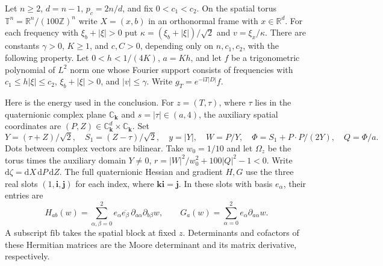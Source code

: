 Let $n\ge2$, $d=n-1$, $p_c=2n/d$, and fix $0<c_1<c_2$. On the spatial torus $\mathbb T^n=\mathbb R^n/(100\mathbb Z)^n$ write $X=(x,b)$ in an orthonormal frame with $x\in\mathbb R^d$. For each frequency with $\xi_b+|\xi|>0$ put $\kappa=(\xi_b+|\xi|)/\sqrt2$ and $v=\xi_x/\kappa$. There are constants $\gamma>0$, $K\ge1$, and $c,C>0$, depending only on $n,c_1,c_2$, with the following property. Let $0<h<1/(4K)$, $a=Kh$, and let $f$ be a trigonometric polynomial of $L^2$ norm one whose Fourier support consists of frequencies with $c_1\le h|\xi|\le c_2$, $\xi_b+|\xi|>0$, and $|v|\le\gamma$. Write $g_T=e^{-\mathrm i T|D|}f$.

Here is the energy used in the conclusion. For $z=(T,\tau)$, where $\tau$ lies in the quaternionic complex plane $\mathbb C_{\mathbf k}$ and $s=|\tau|\in(a,4)$, the auxiliary spatial coordinates are $(P,Z)\in\mathbb C_{\mathbf k}^{d}\times\mathbb C_{\mathbf k}$. Set
\[
Y=(\tau+Z)/\sqrt2,\quad S_1=(Z-\tau)/\sqrt2,\quad
y=|Y|,\quad W=P/Y,\quad \Phi=S_1+P\cdot P/(2Y),\quad Q=\Phi/a .
\]
Dots between complex vectors are bilinear. Take $w_0=1/10$ and let $\Omega_z$ be the torus times the auxiliary domain $Y\ne0$, $r=|W|^2/w_0^2+100|Q|^2-1<0$. Write $\mathrm d\zeta=\mathrm dX\,\mathrm dP\,\mathrm dZ$. The full quaternionic Hessian and gradient $H,G$ use the three real slots $(1,\mathbf i,\mathbf j)$ for each index, where $\mathbf k\mathbf i=\mathbf j$. In these slots with basis $e_\alpha$, their entries are
\[
H_{ab}(w)=\sum_{\alpha,\beta=0}^2 e_\alpha\overline{e_\beta}\,\partial_{a\alpha}\partial_{b\beta}w,\qquad
G_a(w)=\sum_{\alpha=0}^2e_\alpha\partial_{a\alpha}w .
\]
A subscript $\mathrm{fib}$ takes the spatial block at fixed $z$. Determinants and cofactors of these Hermitian matrices are the Moore determinant and its matrix derivative, respectively.

